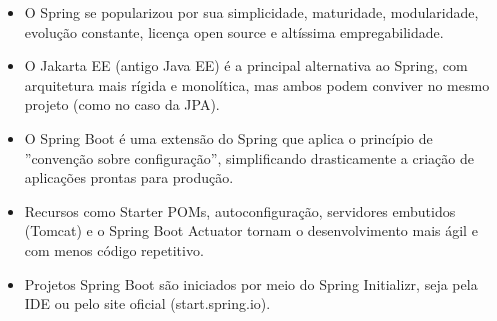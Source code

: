 \begin{itemize}
  \item O Spring se popularizou por sua simplicidade, maturidade, modularidade, evolução constante, licença open source e altíssima empregabilidade.
\end{itemize}

\begin{itemize}
  \item O Jakarta EE (antigo Java EE) é a principal alternativa ao Spring, com arquitetura mais rígida e monolítica, mas ambos podem conviver no mesmo projeto (como no caso da JPA).
\end{itemize}

\begin{itemize}
  \item O Spring Boot é uma extensão do Spring que aplica o princípio de ”convenção sobre configuração”, simplificando drasticamente a criação de aplicações prontas para produção.
\end{itemize}

\begin{itemize}
  \item Recursos como Starter POMs, autoconfiguração, servidores embutidos (Tomcat) e o Spring Boot Actuator tornam o desenvolvimento mais ágil e com menos código repetitivo.
\end{itemize}

\begin{itemize}
  \item Projetos Spring Boot são iniciados por meio do Spring Initializr, seja pela IDE ou pelo site oficial (start.spring.io).
\end{itemize}
